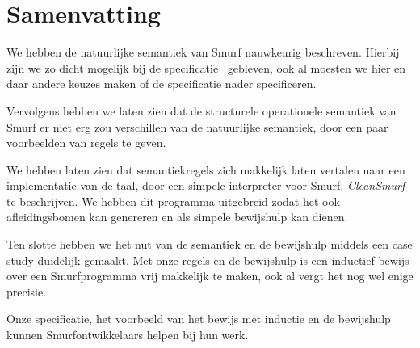 \section{Samenvatting}
\label{sec:summ}

We hebben de natuurlijke semantiek van Smurf nauwkeurig beschreven. Hierbij
zijn we zo dicht mogelijk bij de specificatie~\cite{safalra} gebleven, ook al
moesten we hier en daar andere keuzes maken of de specificatie nader
specificeren.

Vervolgens hebben we laten zien dat de structurele operationele semantiek van
Smurf er niet erg zou verschillen van de natuurlijke semantiek, door een paar
voorbeelden van regels te geven.

We hebben laten zien dat semantiekregels zich makkelijk laten vertalen naar een
implementatie van de taal, door een simpele interpreter voor Smurf,
\emph{CleanSmurf} te beschrijven. We hebben dit programma uitgebreid zodat het
ook afleidingsbomen kan genereren en als simpele bewijshulp kan dienen.

Ten slotte hebben we het nut van de semantiek en de bewijshulp middels een
case study duidelijk gemaakt. Met onze regels en de bewijshulp is een inductief
bewijs over een Smurfprogramma vrij makkelijk te maken, ook al vergt het nog
wel enige precisie.

Onze specificatie, het voorbeeld van het bewijs met inductie en de bewijshulp
kunnen Smurfontwikkelaars helpen bij hun werk.
